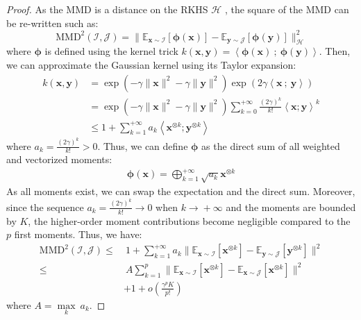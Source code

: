 \documentclass[10pt,twocolumn,letterpaper]{article}
\def\vx{{\bm{x}}}
\def\vy{{\bm{y}}}
\newcommand{\E}{\mathbb{E}}
\begin{document}
        \begin{proof}
            As the MMD is a distance on the RKHS $\mathcal{H}$ \cite{Gretton_2007_NIPS}, the square of the MMD can be re-written such as:
            \begin{equation}
                \text{MMD}^2(\mathcal{I},\mathcal{J}) = \| \E_{\vx \sim \mathcal{I}}[\boldsymbol{\phi}(\vx)] - \E_{\vy \sim \mathcal{J}}[\boldsymbol{\phi}(\vy)] \|^2_\mathcal{H}
            \end{equation}
            where $\boldsymbol{\phi}$ is defined using the kernel trick $k(\vx, \vy) = \left< \boldsymbol{\phi}(\vx) \ ; \ \boldsymbol{\phi}(\vy) \right>$.
            Then, we can approximate the Gaussian kernel using its Taylor expansion:
            \begin{align}
                \nonumber k(\vx, \vy) &= \exp({-\gamma\|\vx\|^2 - \gamma\|\vy\|^2}) \exp({2\gamma\left<\vx \ ; \ \vy\right>})  \\
                    \nonumber &= \exp({-\gamma\|\vx\|^2 - \gamma\|\vy\|^2}) \sum_{k=0}^{+\infty} \frac{(2\gamma)^k}{k!} \left< \vx ; \vy\right>^k \\
                     &\leq 1 + \sum_{k=1}^{+\infty} a_k \left< \vx^{\otimes k} ; \vy^{\otimes k} \right>
            \end{align}
            where $a_k =\frac{(2\gamma)^k}{k!} > 0$.
            Thus, we can define $\boldsymbol{\phi}$ as the direct sum of all weighted and vectorized moments:
            \begin{align}\label{eq:phi_kernel_trick}
                \boldsymbol{\phi}(\vx) = \bigoplus_{k=1}^{+\infty} \sqrt{a_k} \vx^{\otimes k}
            \end{align}
            As all moments exist, we can swap the expectation and the direct sum.
            Moreover, since the sequence $a_k = \frac{(2 \gamma)^k}{k!} \xrightarrow{} 0$ when $k \xrightarrow{} + \infty$ and the moments are bounded by $K$, the higher-order moment contributions become negligible compared to the $p$ first moments. 
            Thus, we have:
            \begin{align}
                \nonumber \text{MMD}^2(\mathcal{I},\mathcal{J}) \leq& \ 1 + \sum_{k=1}^{+\infty} a_k \| \E_{\vx\sim \mathcal{I}}[\vx^{\otimes k}]  - \E_{\vy\sim \mathcal{J}}[\vy^{\otimes k}] \|^2\\
                \nonumber \leq& \ A \sum_{k=1}^p \| \E_{\vx\sim \mathcal{I}}[\vx^{\otimes k}]  - \E_{\vx\sim \mathcal{J}}[\vx^{\otimes k}] \|^2 \\
                & +  1 + o(\frac{\gamma^p K}{p!})
            \end{align}
            where $A = \underset{k}{\max} \ a_k$.
        \end{proof}
        
\end{document}
